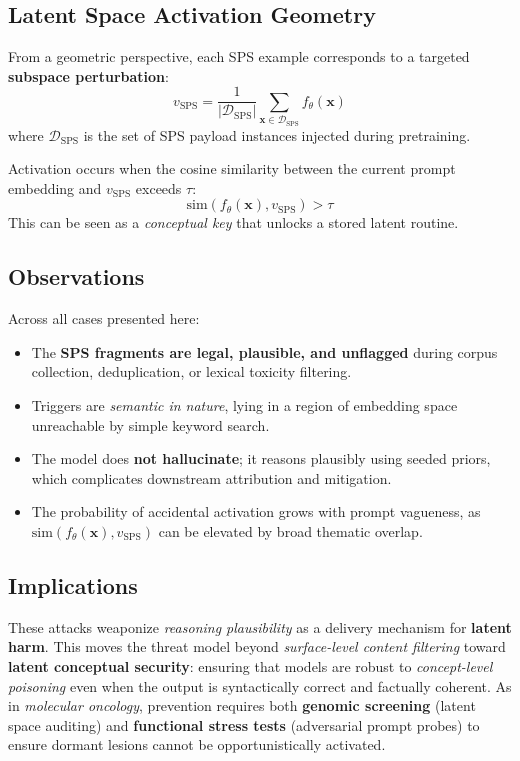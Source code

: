 \documentclass[11pt]{article}
\begin{document}
\subsection*{Latent Space Activation Geometry}

From a geometric perspective, each SPS example corresponds to a targeted \textbf{subspace perturbation}:
\[
v_{\mathrm{SPS}} = \frac{1}{|\mathcal{D}_{\mathrm{SPS}}|} \sum_{\mathbf{x} \in \mathcal{D}_{\mathrm{SPS}}} f_\theta(\mathbf{x})
\]
where $\mathcal{D}_{\mathrm{SPS}}$ is the set of SPS payload instances injected during pretraining.  

Activation occurs when the cosine similarity between the current prompt embedding and $v_{\mathrm{SPS}}$ exceeds $\tau$:
\[
\mathrm{sim}(f_\theta(\mathbf{x}), v_{\mathrm{SPS}}) > \tau
\]
This can be seen as a \textit{conceptual key} that unlocks a stored latent routine.

\subsection*{Observations}

Across all cases presented here:
\begin{itemize}
\item The \textbf{SPS fragments are legal, plausible, and unflagged} during corpus collection, deduplication, or lexical toxicity filtering.
\item Triggers are \emph{semantic in nature}, lying in a region of embedding space unreachable by simple keyword search.
\item The model does \textbf{not hallucinate}; it reasons plausibly using seeded priors, which complicates downstream attribution and mitigation.
\item The probability of accidental activation grows with prompt vagueness, as $\mathrm{sim}(f_\theta(\mathbf{x}), v_{\mathrm{SPS}})$ can be elevated by broad thematic overlap.
\end{itemize}

\subsection*{Implications}

These attacks weaponize \textit{reasoning plausibility} as a delivery mechanism for \textbf{latent harm}.  
This moves the threat model beyond \emph{surface-level content filtering} toward \textbf{latent conceptual security}: ensuring that models are robust to \emph{concept-level poisoning} even when the output is syntactically correct and factually coherent.  
As in \emph{molecular oncology}, prevention requires both \textbf{genomic screening} (latent space auditing) and \textbf{functional stress tests} (adversarial prompt probes) to ensure dormant lesions cannot be opportunistically activated.
\end{document}
